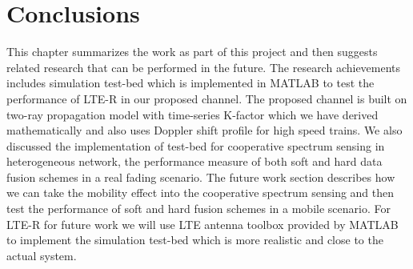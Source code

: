 \chapter{Conclusions}
\label{conclusion}
This chapter summarizes the work as part of this project and then suggests related research that can be performed in the future. The research achievements includes simulation test-bed which is implemented in MATLAB to test the performance of LTE-R in our proposed channel. The proposed channel is built on two-ray propagation model with time-series K-factor which we have derived mathematically and also uses Doppler shift profile for high speed trains. We also discussed the implementation of test-bed for cooperative spectrum sensing in heterogeneous network, the performance measure of both soft and hard data fusion schemes in a real fading scenario. The future work section describes how we can take the mobility effect into the cooperative spectrum sensing and then test the performance of soft and hard fusion schemes in a mobile scenario. For LTE-R for future work we will use LTE antenna toolbox provided by MATLAB to implement the simulation test-bed which is more realistic and close to the actual system.

